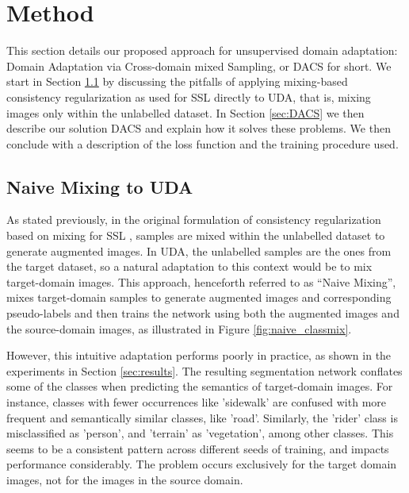 \documentclass[10pt,twocolumn,letterpaper]{article}
\begin{document}
\section{Method}
\label{sec:method}


This section details our proposed approach for unsupervised domain adaptation: Domain Adaptation via Cross-domain mixed Sampling, or DACS for short. We start in Section \ref{sec:naivemix} by discussing the pitfalls of applying mixing-based consistency regularization as used for SSL directly to UDA, that is, mixing images only within the unlabelled dataset. In Section \ref{sec:DACS} we then describe our solution DACS and explain how it solves these problems.
We then conclude with a description of the loss function and the training procedure used. 






\subsection{Naive Mixing to UDA}
\label{sec:naivemix}
As stated previously, in the original formulation of consistency regularization based on mixing for SSL \cite{French,StructuredLoss,ClassMix}, samples are mixed within the unlabelled dataset to generate augmented images. In UDA, the unlabelled samples are the ones from the target dataset, so a natural adaptation to this context would be to mix target-domain images. This approach, henceforth referred to as ``Naive Mixing'', mixes target-domain samples to generate augmented images and corresponding pseudo-labels and then trains the network using both the augmented images and the source-domain images, as illustrated in Figure \ref{fig:naive_classmix}. 



However, this intuitive adaptation performs poorly in practice, as shown in the experiments in Section \ref{sec:results}. The resulting segmentation network conflates some of the classes when predicting the semantics of target-domain images. For instance, classes with fewer occurrences like 'sidewalk' are confused with more frequent and semantically similar classes, like 'road'. Similarly, the 'rider' class is misclassified as 'person', and 'terrain' as 'vegetation', among other classes. This seems to be a consistent pattern across different seeds of training, and impacts performance considerably. The problem occurs exclusively for the target domain images, not for the images in the source domain.
\end{document}
